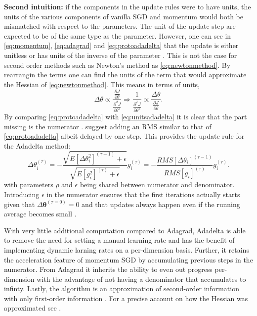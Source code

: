 \textbf{Second intuition:} if the components in the update rules were to have units, the units of the various components of vanilla SGD and momentum would both be mismatched with respect to the parameters. The unit of the update step are expected to be of the same type as the parameter. However, one can see in \cref{eq:momentum}, \cref{eq:adagrad} and \cref{eq:protoadadelta} that the update is either unitless or has units of the inverse of the parameter \citep{Zeiler2012ADADELTA:Method}. This is not the case for second order methods such as Newton's method as \cref{eq:newtonmethod}. By rearrangin the terms one can find the units of the term that would approximate the Hessian of \cref{eq:newtonmethod}. This means in terms of units,
\begin{equation} \label{eq:unitsadadelta}
    \Delta \theta \propto \dfrac{\frac{\partial J}{\partial \theta}}{\frac{\partial^2 J}{\partial \theta^2}} \Rightarrow \dfrac{1}{\frac{\partial^2 J}{\partial \theta^2}} \propto \dfrac{\Delta \theta}{\frac{\partial J}{\partial \theta}}.
\end{equation}
By comparing \cref{eq:protoadadelta} with \cref{eq:unitsadadelta} it is clear that the part missing is the numerator \citep{Zeiler2012ADADELTA:Method}. \citet{Zeiler2012ADADELTA:Method} suggest adding an RMS similar to that of \cref{eq:protoadadelta} albeit delayed by one step. This provides the update rule for the Adadelta method:
\begin{equation}
    \Delta \theta^{(\tau)}_i = - \dfrac{\sqrt{E[\Delta\theta_i^2]^{(\tau-1)} + \epsilon}}{\sqrt{E[g_i^2]^{(\tau)} + \epsilon}} g^{(\tau)}_i = - \dfrac{RMS[\Delta\theta_i]^{(\tau-1)}}{RMS[g_i]^{(\tau)}} g^{(\tau)}_i.
\end{equation}
with parameters $\rho$ and $\epsilon$ being shared between numerator and denominator. Introducing $\epsilon$ in the numerator ensures that the first iterations actually starts given that $\Delta\bm{\theta}^{(\tau=0)} = 0$ and that updates always happen even if the running average becomes small \citep{Zeiler2012ADADELTA:Method}.

With very little additional computation compared to Adagrad, Adadelta is able to remove the need for setting a manual learning rate and has the benefit of implementing dynamic larning rates on a per-dimension basis. Further, it retains the acceleration feature of momentum SGD by accumulating previous steps in the numerator. From Adagrad it inherits the ability to even out progress per-dimension with the advantage of not having a denominator that accumulates to infinty. Lastly, the algorithm is an approximation of second-order information with only first-order information \citep{Zeiler2012ADADELTA:Method}. For a precise account on how the Hessian was approximated see  \citet{Becker1989ImprovingMethods}.

